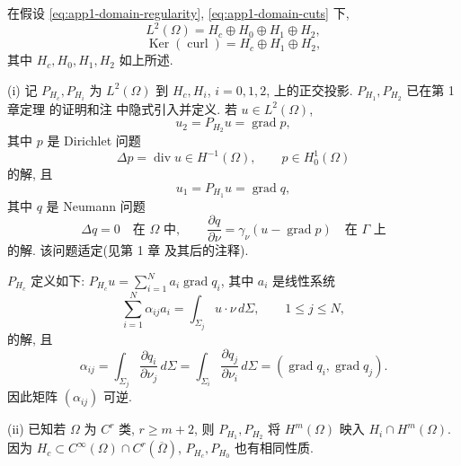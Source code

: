 \begin{Proposition}
\label{prop:app1-orthogonal-decomposition}
在假设 \eqref{eq:app1-domain-regularity}, \eqref{eq:app1-domain-cuts} 下,
\begin{equation}
L^2(\Omega)=H_c\oplus H_0\oplus H_1\oplus H_2,
\label{eq:app1-full-l2-decomposition}
\end{equation}
\begin{equation}
\operatorname{Ker}(\operatorname{curl})=H_c\oplus H_1\oplus H_2,
\label{eq:app1-full-kernel-decomposition}
\end{equation}
其中 $H_c,H_0,H_1,H_2$ 如上所述.
\end{Proposition}

\begin{Remark}
\label{rem:app1-projectors}
(i) 记 $P_{H_c},P_{H_i}$ 为 $L^2(\Omega)$ 到 $H_c,H_i$, $i=0,1,2$, 上的正交投影. $P_{H_1},P_{H_2}$ 已在第 1 章定理  的证明和注  中隐式引入并定义. 若 $u\in L^2(\Omega)$,
\begin{equation}
u_2=P_{H_2}u=\operatorname{grad}p,
\label{eq:app1-H2-projection}
\end{equation}
其中 $p$ 是 Dirichlet 问题
\begin{equation}
\Delta p=\operatorname{div}u\in H^{-1}(\Omega),
\qquad p\in H_0^1(\Omega)
\label{eq:app1-H2-dirichlet-problem}
\end{equation}
的解, 且
\begin{equation}
u_1=P_{H_1}u=\operatorname{grad}q,
\label{eq:app1-H1-projection}
\end{equation}
其中 $q$ 是 Neumann 问题
\begin{equation}
\Delta q=0\quad\text{在 }\Omega\text{ 中},
\qquad\frac{\partial q}{\partial\nu}=\gamma_\nu(u-\operatorname{grad}p)
\quad\text{在 }\Gamma\text{ 上}
\label{eq:app1-H1-neumann-problem}
\end{equation}
的解. 该问题适定(见第 1 章  及其后的注释).

$P_{H_c}$ 定义如下: $P_{H_c}u=\sum_{i=1}^Na_i\operatorname{grad}q_i$, 其中 $a_i$ 是线性系统
\begin{equation}
\sum_{i=1}^N\alpha_{ij}a_i
=\int_{\Sigma_j}u\cdot\nu\,d\Sigma,
\qquad1\leq j\leq N,
\label{eq:app1-Hc-projection-system}
\end{equation}
的解, 且
\[
\alpha_{ij}=\int_{\Sigma_j}\frac{\partial q_i}{\partial\nu_j}\,d\Sigma
=\int_{\Sigma_i}\frac{\partial q_j}{\partial\nu_i}\,d\Sigma
=(\operatorname{grad}q_i,\operatorname{grad}q_j).
\]
因此矩阵 $(\alpha_{ij})$ 可逆.

(ii) 已知若 $\Omega$ 为 $C^r$ 类, $r\geq m+2$, 则 $P_{H_1},P_{H_2}$ 将 $H^m(\Omega)$ 映入 $H_i\cap H^m(\Omega)$. 因为 $H_c\subset C^\infty(\Omega)\cap C^r(\overline\Omega)$, $P_{H_c},P_{H_0}$ 也有相同性质.
\end{Remark}

